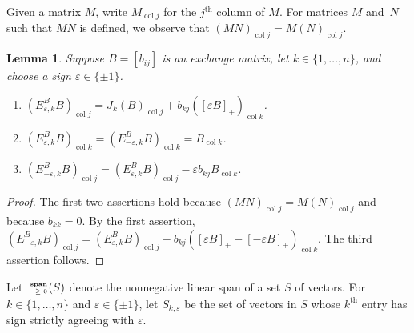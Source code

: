\documentclass{amsart}
\newtheorem{lemma}[proposition]{Lemma}
\theoremstyle{definition}
\theoremstyle{remark}
\numberwithin{equation}{section}
\newcommand{\ep}{\varepsilon}
\newcommand{\col}{\operatorname{col}}
\newcommand{\sgn}{\operatorname{sgn}}
\newcommand{\nnspan}{{\!\!\tiny\begin{array}{r}\mathbf{span}\\\ge0\end{array}\hspace*{-0.57em}}}
\newcommand{\set}[1]{{\lbrace #1 \rbrace}}
\renewcommand{\th}{^\text{th}}
\newcommand{\0}{{\mathbf{0}}}
\renewcommand{\th}{^\text{th}}
\begin{document}

Given a matrix $M$, write $M_{\col j}$ for the $j\th$ column of $M$.
For matrices $M$ and~$N$ such that $MN$ is defined, we observe that $(MN)_{\col j}=M(N)_{\col j}$.
\begin{lemma}\label{columns lem}
Suppose $B=[b_{ij}]$ is an exchange matrix, let $k\in\set{1,\ldots,n}$, and choose a sign $\ep\in\set{\pm1}$.
\begin{enumerate}[label=\bf\arabic*., ref=\arabic*]
\item \label{col j}
$(E_{\ep,k}^BB)_{\col j}=J_k(B)_{\col j}+b_{kj}([\ep B]_+)_{\col k}$.
\item \label{col k}
$(E_{\ep,k}^BB)_{\col k}=(E_{-\ep,k}^BB)_{\col k}=B_{\col k}$.
\item \label{cols k}
$(E_{-\ep,k}^BB)_{\col j}=(E_{\ep,k}^BB)_{\col j}-\ep b_{kj}B_{\col k}$.
\end{enumerate}
\end{lemma}
\begin{proof}
The first two assertions hold because $(MN)_{\col j}=M(N)_{\col j}$ and because $b_{kk}=0$.
By the first assertion, $(E_{-\ep,k}^BB)_{\col j}=(E_{\ep,k}^BB)_{\col j}-b_{kj}([\ep B]_+-[-\ep B]_+)_{\col k}$.  
The third assertion follows.
\end{proof}

Let~$\nnspan(S)$ denote the nonnegative linear span of a set $S$ of vectors.
For ${k\in\set{1,\ldots,n}}$ and $\ep\in\set{\pm1}$, let $S_{k,\ep}$ be the set of vectors in $S$ whose $k\th$ entry has sign strictly agreeing with $\ep$.
\end{document}
